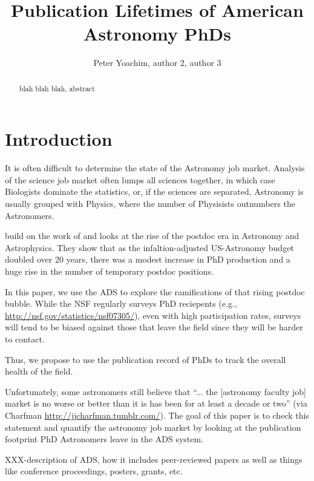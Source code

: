 \documentclass{emulateapj}
\begin{document}
\title{Publication Lifetimes of American Astronomy PhDs}

\author{Peter Yoachim, author 2, author 3 
  }




\begin{abstract}
blah blah blah, abstract

\end{abstract}



\section{Introduction}

It is often difficult to determine the state of the Astronomy job market.  Analysis of the science job market often lumps all sciences together, in which case Biologists dominate the statistics, or, if the sciences are separated, Astronomy is usually grouped with Physics, where the number of Physisists outnumbers the Astronomers.  

\citet{Seth09} build on the work of \citet{Metcalfe08} and looks at the rise of the postdoc era in Astronomy and Astrophysics.  They show that as the infaltion-adjusted US-Astronomy budget doubled over 20 years, there was a modest increase in PhD production and a huge rise in the number of temporary postdoc positions.

In this paper, we use the ADS to explore the ramifications of that rising postdoc bubble.  While the NSF regularly surveys PhD reciepents (e.g., \url{http://nsf.gov/statistics/nsf07305/}), even with high participation rates, surveys will tend to be biased against those that leave the field since they will be harder to contact.

Thus, we propose to use the publication record of PhDs to track the overall health of the field.  

Unfortunately, some astronomers still believe that ``... the [astronomy faculty job] market is no worse or better than it is has been for at least a decade or two'' (via Charfman \url{http://jjcharfman.tumblr.com/}).  The goal of this paper is to check this statement and quantify the astronomy job market by looking at the publication footprint PhD Astronomers leave in the ADS system. 

XXX-description of ADS, how it includes peer-reviewed papers as well as things like conference proceedings, posters, grants, etc.
\end{document}
